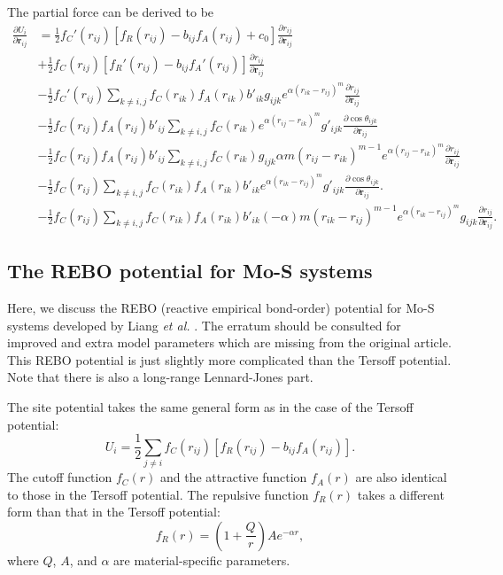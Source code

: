 \documentclass[12pt,a4paper]{report}
\newcommand{\vect}[1]{\boldsymbol{#1}}
\begin{document}
The partial force can be derived to be
\begin{align}
\frac{\partial U_i}{\partial \vect{r}_{ij}}
&= \frac{1}{2}f_C'(r_{ij})[f_R(r_{ij})-b_{ij}f_A(r_{ij})+c_0]\frac{\partial r_{ij}}{\partial \vect{r}_{ij}} \nonumber \\
&+ \frac{1}{2}f_C(r_{ij})[f_R'(r_{ij})-b_{ij}f_A'(r_{ij})]\frac{\partial r_{ij}}{\partial \vect{r}_{ij}} \nonumber \\
&- \frac{1}{2}f_C'(r_{ij})\sum_{k\neq i,j}f_C(r_{ik})f_A(r_{ik})b'_{ik}g_{ijk} e^{\alpha (r_{ik}-r_{ij})^m}\frac{\partial r_{ij}}{\partial \vect{r}_{ij}} \nonumber \\
&- \frac{1}{2}f_C(r_{ij})f_A(r_{ij})b'_{ij}\sum_{k\neq i,j}f_C(r_{ik}) e^{\alpha (r_{ij}-r_{ik})^m} g'_{ijk}
   \frac{\partial \cos\theta_{ijk}}{\partial \vect{r}_{ij}} \nonumber \\
&- \frac{1}{2}f_C(r_{ij})f_A(r_{ij})b'_{ij}\sum_{k\neq i,j}f_C(r_{ik}) g_{ijk} \alpha m (r_{ij}-r_{ik})^{m-1} e^{\alpha (r_{ij}-r_{ik})^m}
   \frac{\partial r_{ij}}{\partial \vect{r}_{ij}} \nonumber \\
&- \frac{1}{2}f_C(r_{ij})\sum_{k\neq i,j}f_C(r_{ik})f_A(r_{ik})b'_{ik} e^{\alpha (r_{ik}-r_{ij})^m} g'_{ijk}
   \frac{\partial \cos\theta_{ijk}}{\partial \vect{r}_{ij}}. \nonumber \\
&- \frac{1}{2}f_C(r_{ij})\sum_{k\neq i,j}f_C(r_{ik})f_A(r_{ik})b'_{ik} (-\alpha) m (r_{ik}-r_{ij})^{m-1} e^{\alpha (r_{ik}-r_{ij})^m}
   g_{ijk} \frac{\partial r_{ij}}{\partial \vect{r}_{ij}}.
\end{align}

\subsection{The REBO potential for Mo-S systems}

Here, we discuss the REBO (reactive empirical bond-order) potential for Mo-S systems developed by Liang \textit{et al.} \cite{liang2009prb}. The erratum \cite{liang2012prb_erratum} should be consulted for improved and extra model parameters which are missing from the original article. This REBO potential is just slightly more complicated than the Tersoff potential. Note that there is also a long-range Lennard-Jones part.


The site potential takes the same general form as in the case of the Tersoff potential:
\begin{equation}
U_i =  \frac{1}{2} \sum_{j \neq i} f_C(r_{ij}) \left[ f_R(r_{ij}) - b_{ij} f_A(r_{ij}) \right].
\end{equation}
The cutoff function $f_{C}(r)$ and the attractive function $f_{A}(r)$ are also identical to those in the Tersoff potential. The repulsive function $f_{R}(r)$ takes a different form than that in the Tersoff potential:
\begin{equation}
f_{R}(r) = \left(1+\frac{Q}{r}\right) A e^{-\alpha r},
\end{equation}
where $Q$, $A$, and $\alpha$ are material-specific parameters.
\end{document}
